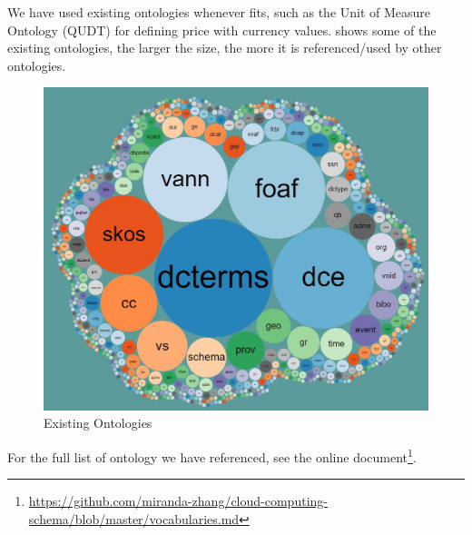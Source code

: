 We have used existing ontologies whenever fits, such as the Unit of Measure Ontology (QUDT) \cite{OntologyUnitsOfMeasure} for defining price with currency values.
 shows some of the existing ontologies, the larger the size, the more it is referenced/used by other ontologies.
\begin{figure}[ht]
  \includegraphics[width=\textwidth]{Figures/background/LOV.jpg}
  \caption{Existing Ontologies}
  \label{fig:ExistingOntologies}
\end{figure}
 For the full list of ontology we have referenced, see the online document\footnote{\url{https://github.com/miranda-zhang/cloud-computing-schema/blob/master/vocabularies.md}}.

